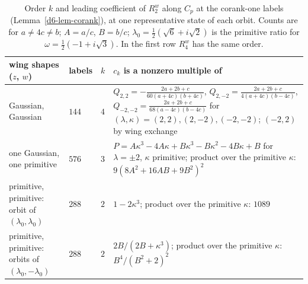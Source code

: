 \documentclass[11pt]{amsart}
\theoremstyle{definition}
\theoremstyle{remark}
\begin{document}
\begin{table}[ht]
\centering
\small
\begin{tabular}{p{3.3cm}p{0.9cm}p{0.3cm}p{6.6cm}}
\hline
wing shapes ($z$, $w$) & labels & $k$ & $c_k$ is a nonzero multiple of \\
\hline
Gaussian, Gaussian & $144$ & $4$ &
$Q_{2,2}=-\frac{2a+2b+c}{60(a+4c)(b+4c)}$, $Q_{2,-2}=\frac{2a+2b+c}{4(a+4c)(b-4c)}$,
$Q_{-2,-2}=\frac{2a+2b+c}{68(a-4c)(b-4c)}$ for $(\lambda,\kappa)=(2,2),(2,-2),(-2,-2)$;
$(-2,2)$ by wing exchange \\
one Gaussian, one primitive & $576$ & $3$ &
$P=A\kappa^3-4A\kappa+B\kappa^3-B\kappa^2-4B\kappa+B$ for $\lambda=\pm2$, $\kappa$ primitive;
product over the primitive $\kappa$: $9(8A^2+16AB+9B^2)^2$ \\
primitive, primitive: orbit of $(\lambda_0,\lambda_0)$ & $288$ & $2$ &
$1-2\kappa^3$; product over the primitive $\kappa$: $1089$ \\
primitive, primitive: orbits of $(\lambda_0,-\lambda_0)$ & $288$ & $2$ &
$2B/(2B+\kappa^3)$; product over the primitive $\kappa$: $B^4/(B^2+2)^2$ \\
\hline
\end{tabular}
\caption{Order $k$ and leading coefficient of $R^w_2$ along $C_p$ at the corank-one labels
(Lemma~\ref{d6-lem-corank}), at one representative state of each orbit.  Counts are for
$a\ne4c\ne b$; $A=a/c$, $B=b/c$; $\lambda_0=\frac12(\sqrt6+i\sqrt2)$ is the primitive ratio for
$\omega=\frac12(-1+i\sqrt3)$.  In the first row $R^w_4$ has the same order.}\label{d6-tab-corank}
\end{table}
\end{document}
